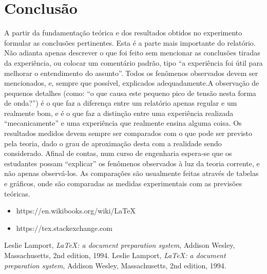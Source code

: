 \documentclass[10pt,conference]{IEEEtran}                      %
\begin{document}
\section{Conclusão}
A partir da fundamentação teórica e dos resultados obtidos no experimento formular as conclusões pertinentes. Esta é a parte mais importante do relatório. Não adianta apenas descrever o que foi feito sem mencionar as conclusões tiradas da experiência, ou colocar um comentário padrão, tipo “a experiência foi útil para melhorar o entendimento do assunto”. Todos os fenômenos observados devem ser mencionados, e, sempre que possível, explicados adequadamente.A observação de pequenos detalhes (como: “o que causa este pequeno pico de tensão nesta forma de onda?”) é o que faz a diferença entre um relatório apenas regular e um realmente bom, e é o que faz a distinção entre uma experiência realizada “mecanicamente” e uma experiência que realmente ensina alguma coisa. Os resultados medidos devem sempre ser comparados com o que pode ser previsto pela teoria, dado o grau de aproximação desta com a realidade sendo considerado. Afinal de contas, num curso de engenharia espera-se que os estudantes possam “explicar” os fenômenos observados à luz da teoria corrente, e não apenas observá-los. As comparações são usualmente feitas através de tabelas e gráficos, onde são comparadas as medidas experimentais com as previsões teóricas.
\begin{itemize}
	\item https://en.wikibooks.org/wiki/LaTeX
	\item https://tex.stackexchange.com
\end{itemize}
\begin{thebibliography}{9}
	Leslie Lamport,
	\emph{\LaTeX: a document preparation system},
	Addison Wesley, Massachusetts,
	2nd edition,
	1994.
	Leslie Lamport,
	\emph{\LaTeX: a document preparation system},
	Addison Wesley, Massachusetts,
	2nd edition,
	1994.
\end{thebibliography}
\end{document}
